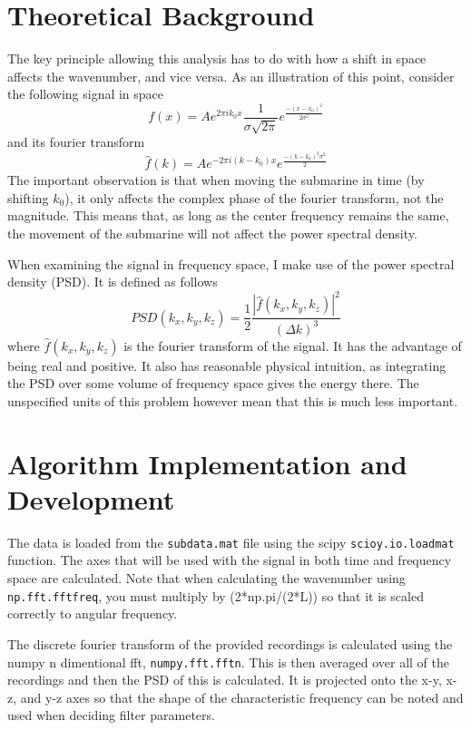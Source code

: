 \documentclass{article}
\begin{document}
    \section{Theoretical Background}
    The key principle allowing this analysis has to do with how a shift in space affects the wavenumber, and vice versa. As an illustration of this point, consider the following signal in space
    \begin{equation}
        f(x) = A e^{2 \pi i k_0 x} \frac{1}{\sigma \sqrt{2 \pi}} e^{\frac{-(x-x_0)^2}{2 \sigma^2}}
    \end{equation}
    and its fourier transform
    \begin{equation}
        \hat{f}(k) = A e^{-2 \pi i (k - k_0) x} e^{\frac{-(k - k_0)^2 \sigma^2}{2}}
    \end{equation}
    The important observation is that when moving the submarine in time (by shifting $k_0$), it only affects the complex phase of the fourier transform, not the magnitude. This means that, as long as the center frequency remains the same, the movement of the submarine will not affect the power spectral density.

    When examining the signal in frequency space, I make use of the power spectral density (PSD). It is defined as follows
    \begin{equation}
        PSD(k_x, k_y, k_z) = \frac{1}{2} \frac{|\hat{f}(k_x, k_y, k_z)|^2}{(\Delta k)^3}
    \end{equation}
    where $\hat{f}(k_x, k_y, k_z)$ is the fourier transform of the signal. It has the advantage of being real and positive. It also has reasonable physical intuition, as integrating the PSD over some volume of frequency space gives the energy there. The unspecified units of this problem however mean that this is much less important.

    \section{Algorithm Implementation and Development}
    The data is loaded from the \lstinline{subdata.mat} file using the scipy \lstinline{scioy.io.loadmat} function. The axes that will be used with the signal in both time and frequency space are calculated. Note that when calculating the wavenumber using \lstinline{np.fft.fftfreq}, you must multiply by (2*np.pi/(2*L)) so that it is scaled correctly to angular frequency.
    
    The discrete fourier transform of the provided recordings is calculated using the numpy n dimentional fft, \lstinline{numpy.fft.fftn}. This is then averaged over all of the recordings and then the PSD of this is calculated. It is projected onto the x-y, x-z, and y-z axes so that the shape of the characteristic frequency can be noted and used when deciding filter parameters.
\end{document}
